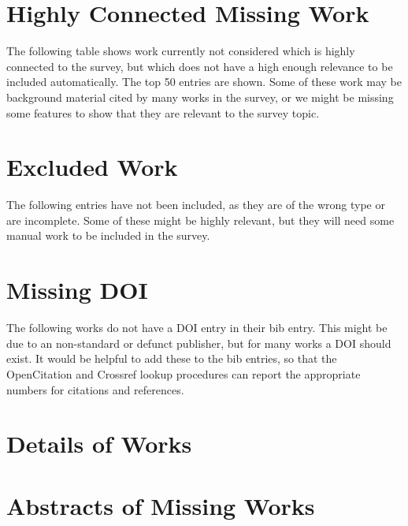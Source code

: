 \documentclass[a4paper]{article}
\begin{document}


\clearpage
\section{Highly Connected Missing Work}

The following table shows work currently not considered which is highly connected to the survey, but which does not have a high enough relevance to be included automatically. The top 50 entries are shown. Some of these work may be background material cited by many works in the survey, or we might be missing some features to show that they are relevant to the survey topic.



\clearpage
\section{Excluded Work}

The following entries have not been included, as they are of the wrong type or are incomplete. Some of these might be highly relevant, but they will need some manual work to be included in the survey.



\clearpage
\section{Missing DOI}

The following works do not have a DOI entry in their bib entry. This might be due to an non-standard or defunct publisher, but for many works a DOI should exist. It would be helpful to add these to the bib entries, so that the OpenCitation and Crossref lookup procedures can report the appropriate numbers for citations and references.



\clearpage
\section{Details of Works}



\clearpage
\section{Abstracts of Missing Works}





\printindex
\end{document}
